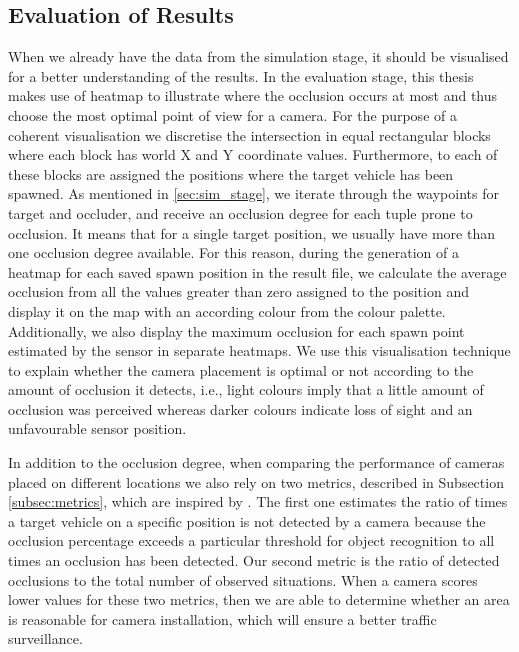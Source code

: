 \subsection{Evaluation of Results} \label{subsec:results_eval}
When we already have the data from the simulation stage, it should be visualised for a better understanding of the results. In the evaluation stage, this thesis makes use of heatmap to illustrate where the occlusion occurs at most and thus choose the most optimal point of view for a camera. For the purpose of a coherent visualisation we discretise the intersection in equal rectangular blocks where each block has world X and Y coordinate values. Furthermore, to each of these blocks are assigned the positions where the target vehicle has been spawned. As mentioned in \ref{sec:sim_stage}, we iterate through the waypoints for target and occluder, and receive an occlusion degree for each tuple prone to occlusion. It means that for a single target position, we usually have more than one occlusion degree available. For this reason, during the generation of a heatmap for each saved spawn position in the result file, we calculate the average occlusion from all the values greater than zero assigned to the position and display it on the map with an according colour from the colour palette. Additionally, we also display the maximum occlusion for each spawn point estimated by the sensor in separate heatmaps. We use this visualisation technique to explain whether the camera placement is optimal or not according to the amount of occlusion it detects, i.e., light colours imply that a little amount of occlusion was perceived whereas darker colours indicate loss of sight and an unfavourable sensor position.

In addition to the occlusion degree, when comparing the performance of cameras placed on different locations we also rely on two metrics, described in Subsection \ref{subsec:metrics}, which are inspired by \cite{occlusion_degree_model}. The first one estimates the ratio of times a target vehicle on a specific position is not detected by a camera because the occlusion percentage exceeds a particular threshold for object recognition to all times an occlusion has been detected. Our second metric is the ratio of detected occlusions to the total number of observed situations. When a camera scores lower values for these two metrics, then we are able to determine whether an area is reasonable for camera installation, which will ensure a better traffic surveillance. 
